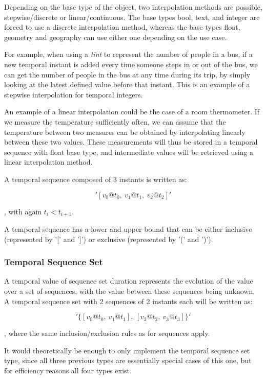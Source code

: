 Depending on the base type of the object, two interpolation methods are possible, stepwise/discrete or linear/continuous. The base types bool, text, and integer are forced to use a discrete interpolation method, whereas the base types float, geometry and geography can use either one depending on the use case.

For example, when using a \textit{tint} to represent the number of people in a bus, if a new temporal instant is added every time someone steps in or out of the bus, we can get the number of people in the bus at any time during its trip, by simply looking at the latest defined value before that instant. This is an example of a stepwise interpolation for temporal integers.

An example of a linear interpolation could be the case of a room thermometer. If we measure the temperature sufficiently often, we can assume that the temperature between two measures can be obtained by interpolating linearly between these two values. These measurements will thus be stored in a temporal sequence with float base type, and intermediate values will be retrieved using a linear interpolation method.

A temporal sequence composed of 3 instants is written as:

\[
    '[v_0@t_0,\ v_1@t_1,\ v_2@t_2]'
\]

, with again \(t_i < t_{i+1}\).

A temporal sequence has a lower and upper bound that can be either inclusive (represented by '[' and ']') or exclusive (represented by '(' and ')').

\subsubsection{Temporal Sequence Set}
\label{section:mobilitydb_s}

A temporal value of sequence set duration represents the evolution of the value over a set of sequences, with the value between these sequences being unknown. A temporal sequence set with 2 sequences of 2 instants each will be written as:

\[
    '\{[v_0@t_0,\ v_1@t_1],\ [v_2@t_2,\ v_3@t_3]\}'
\]

, where the same inclusion/exclusion rules as for sequences apply.

It would theoretically be enough to only implement the temporal sequence set type, since all three previous types are essentially special cases of this one, but for efficiency reasons all four types exist.


